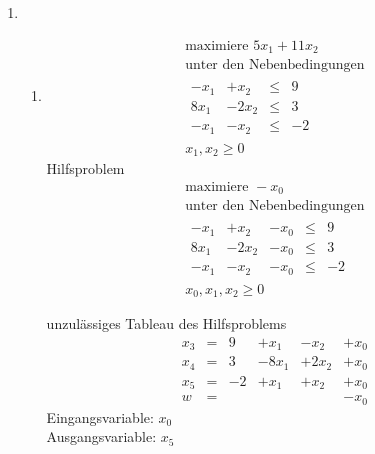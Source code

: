 \documentclass[a4paper]{scrartcl}
\begin{document}
\begin{enumerate}
    \item %
        \begin{enumerate}
            \item
                \begin{equation}
                    \begin{gathered}
                        \text{maximiere }
                        5x_1 +11x_2 \\
                        \text{unter den Nebenbedingungen} \\
                        \begin{array}{rrcr}
                            -x_1 & +x_2  & \leq & 9 \\
                            8x_1 & -2x_2 & \leq & 3 \\
                            -x_1 & -x_2  & \leq & -2
                        \end{array} \\
                        x_1, x_2 \geq 0
                    \end{gathered}
                \end{equation}
                Hilfsproblem
                \begin{equation}
                    \begin{gathered}
                        \text{maximiere }
                        -x_0 \\
                        \text{unter den Nebenbedingungen} \\
                        \begin{array}{rrrcr}
                            -x_1 & +x_2 & -x_0 & \leq & 9 \\
                            8x_1 & -2x_2 & -x_0 & \leq & 3 \\
                            -x_1 & -x_2 & -x_0 & \leq & -2
                        \end{array} \\
                        x_0, x_1, x_2 \geq 0
                    \end{gathered}
                \end{equation}
                
                unzulässiges Tableau des Hilfsproblems
                \begin{equation}
                    \begin{array}{rcrrrr}
                        x_3 & = & 9 & +x_1 & -x_2 & +x_0 \\
                        x_4 & = & 3 & -8x_1 & +2x_2 & +x_0 \\
                        x_5 & = & -2 & +x_1 & +x_2 & +x_0 \\
                        \hline
                        w   & = & & & & -x_0
                    \end{array}
                \end{equation}
                Eingangsvariable: $x_0$ \\
                Ausgangsvariable: $x_5$ \\


\end{enumerate}
\end{enumerate}
\end{document}
